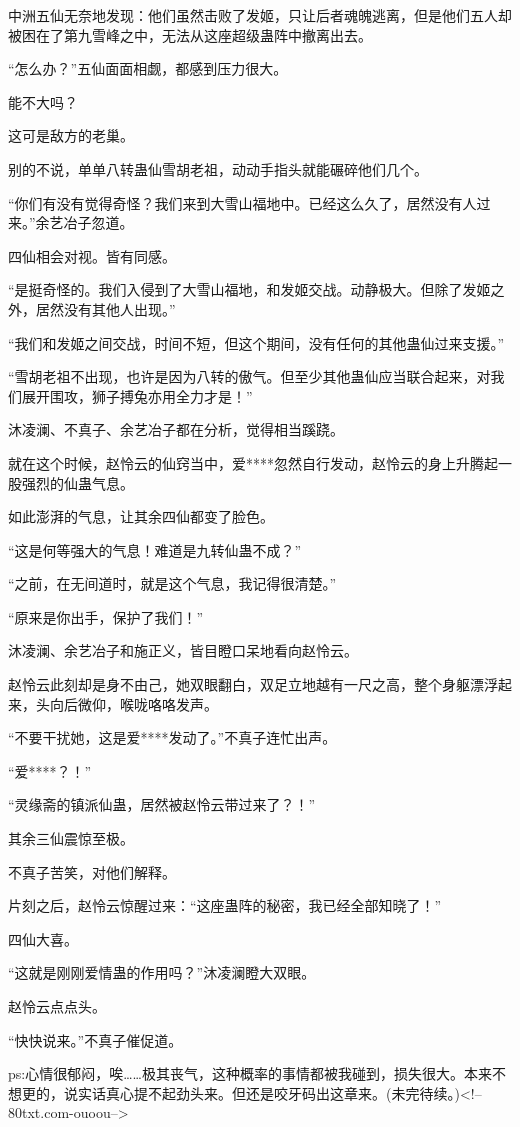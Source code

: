 \begin{this_body}
中洲五仙无奈地发现：他们虽然击败了发姬，只让后者魂魄逃离，但是他们五人却被困在了第九雪峰之中，无法从这座超级蛊阵中撤离出去。

“怎么办？”五仙面面相觑，都感到压力很大。

能不大吗？

这可是敌方的老巢。

别的不说，单单八转蛊仙雪胡老祖，动动手指头就能碾碎他们几个。

“你们有没有觉得奇怪？我们来到大雪山福地中。已经这么久了，居然没有人过来。”余艺冶子忽道。

四仙相会对视。皆有同感。

“是挺奇怪的。我们入侵到了大雪山福地，和发姬交战。动静极大。但除了发姬之外，居然没有其他人出现。”

“我们和发姬之间交战，时间不短，但这个期间，没有任何的其他蛊仙过来支援。”

“雪胡老祖不出现，也许是因为八转的傲气。但至少其他蛊仙应当联合起来，对我们展开围攻，狮子搏兔亦用全力才是！”

沐凌澜、不真子、余艺冶子都在分析，觉得相当蹊跷。

就在这个时候，赵怜云的仙窍当中，爱****忽然自行发动，赵怜云的身上升腾起一股强烈的仙蛊气息。

如此澎湃的气息，让其余四仙都变了脸色。

“这是何等强大的气息！难道是九转仙蛊不成？”

“之前，在无间道时，就是这个气息，我记得很清楚。”

“原来是你出手，保护了我们！”

沐凌澜、余艺冶子和施正义，皆目瞪口呆地看向赵怜云。

赵怜云此刻却是身不由己，她双眼翻白，双足立地越有一尺之高，整个身躯漂浮起来，头向后微仰，喉咙咯咯发声。

“不要干扰她，这是爱****发动了。”不真子连忙出声。

“爱****？！”

“灵缘斋的镇派仙蛊，居然被赵怜云带过来了？！”

其余三仙震惊至极。

不真子苦笑，对他们解释。

片刻之后，赵怜云惊醒过来：“这座蛊阵的秘密，我已经全部知晓了！”

四仙大喜。

“这就是刚刚爱情蛊的作用吗？”沐凌澜瞪大双眼。

赵怜云点点头。

“快快说来。”不真子催促道。

ps:心情很郁闷，唉……极其丧气，这种概率的事情都被我碰到，损失很大。本来不想更的，说实话真心提不起劲头来。但还是咬牙码出这章来。(未完待续。)<!--80txt.com-ouoou-->

\end{this_body}

